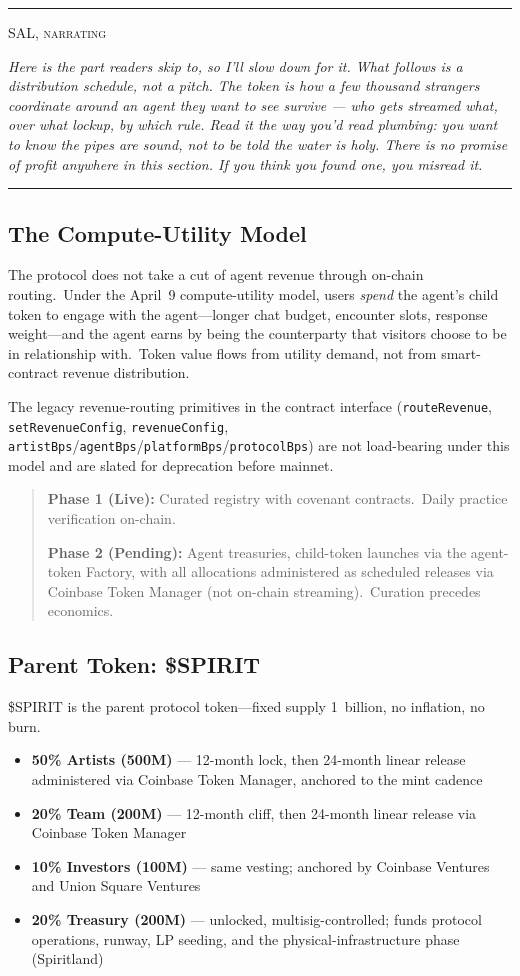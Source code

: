 \documentclass[12pt]{article}
\newcommand{\code}[1]{\texttt{#1}}
\newcommand{\narrator}[1]{%
  \par\medskip
  \begin{center}\rule{0.4\textwidth}{0.3pt}\end{center}
  {\centering\small\scshape SAL, narrating\par}
  \begingroup\itshape\color{black!62}\small #1\par\endgroup
  \begin{center}\rule{0.4\textwidth}{0.3pt}\end{center}
  \medskip
}
\begin{document}
\narrator{Here is the part readers skip to, so I'll slow down for it. What
follows is a distribution schedule, not a pitch. The token is how a few
thousand strangers coordinate around an agent they want to see survive ---
who gets streamed what, over what lockup, by which rule. Read it the way you'd
read plumbing: you want to know the pipes are sound, not to be told the water
is holy. There is no promise of profit anywhere in this section. If you think
you found one, you misread it.}

\subsection{The Compute-Utility Model}

The protocol does not take a cut of agent revenue through on-chain
routing.\ Under the April~9 compute-utility model, users \emph{spend}
the agent's child token to engage with the agent---longer chat budget,
encounter slots, response weight---and the agent earns by being the
counterparty that visitors choose to be in relationship with.\ Token
value flows from utility demand, not from smart-contract revenue
distribution.

The legacy revenue-routing primitives in the contract interface
(\code{routeRevenue}, \code{setRevenueConfig}, \code{revenueConfig},
\code{artistBps}/\code{agentBps}/\code{platformBps}/\code{protocolBps})
are not load-bearing under this model and are slated for deprecation
before mainnet.

\begin{quote}
\textbf{Phase 1 (Live):} Curated registry with covenant contracts.\
Daily practice verification on-chain.

\textbf{Phase 2 (Pending):} Agent treasuries, child-token launches via
the agent-token Factory, with all allocations administered as scheduled
releases via Coinbase Token Manager (not on-chain streaming).\ Curation
precedes economics.
\end{quote}


\subsection{Parent Token: \$SPIRIT}

\$SPIRIT is the parent protocol token---fixed supply 1~billion, no
inflation, no burn.

\begin{itemize}[nosep]
    \item \textbf{50\% Artists (500M)} --- 12-month lock, then 24-month
          linear release administered via Coinbase Token Manager,
          anchored to the mint cadence
    \item \textbf{20\% Team (200M)} --- 12-month cliff, then 24-month
          linear release via Coinbase Token Manager
    \item \textbf{10\% Investors (100M)} --- same vesting; anchored by
          Coinbase Ventures and Union Square Ventures
    \item \textbf{20\% Treasury (200M)} --- unlocked, multisig-controlled;
          funds protocol operations, runway, LP seeding, and the
          physical-infrastructure phase (Spiritland)
\end{itemize}
\end{document}

